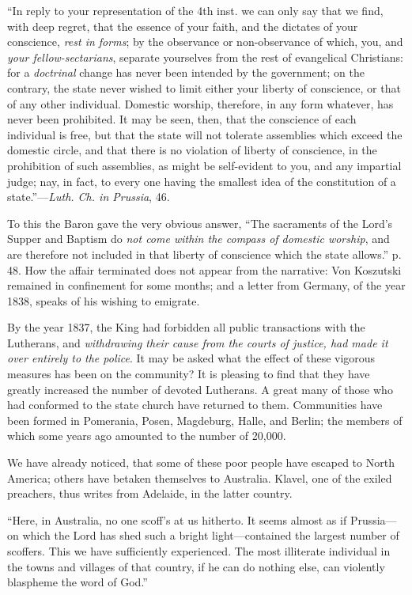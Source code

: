 ``In reply to your representation of
the 4th inst. we can only say that we find, with deep regret, that the
essence of your faith, and the dictates of your conscience, \emph{rest in
forms}; by the observance or non-observance of which, you, and \emph{your
fellow-sectarians}, separate yourselves from the rest of evangelical
Christians: for a \emph{doctrinal} change has never been intended by the
government; on the contrary, the state never wished to limit either your
liberty of conscience, or that of any other individual. Domestic
worship, therefore, in any form whatever, has never been prohibited. It
may be seen, then, that the conscience of each individual is free, but
that the state will not tolerate assemblies which exceed the domestic
circle, and that there is no violation of liberty of conscience, in the
prohibition of such assemblies, as might be self-evident to you, and any
impartial judge; nay, in fact, to every one having the smallest idea of
the constitution of a state.''—\emph{Luth. Ch. in Prussia}, 46.

To this the Baron gave the very obvious answer, ``The
sacraments of the Lord's Supper and Baptism do \emph{not come within the
compass of domestic worship}, and are therefore not included in that
liberty of conscience which the state allows.'' p. 48. How the affair
terminated does not appear from the narrative: Von Koszutski remained in
confinement for some months; and a letter from Germany, of the year
1838, speaks of his wishing to emigrate.

By the year 1837, the King had forbidden all public
transactions with the Lutherans, and \emph{withdrawing their cause from the
courts of justice, had made it over entirely to the police}. It may
be asked what the effect of these vigorous measures has been on the
community? It is pleasing to find that they have greatly increased the
number of devoted Lutherans. A great many of those who had conformed to
the state church have returned to them. Communities have been formed in
Pomerania, Posen, Magdeburg, Halle, and Berlin; the members of which
some years ago amounted to the number of 20,000.

We have already noticed, that some of these poor
people have escaped to North America; others have betaken themselves to
Australia. Klavel, one of the exiled preachers, thus writes from
Adelaide, in the latter country.

``Here, in Australia, no one scoff's
at us hitherto. It seems almost as if Prussia—on which the Lord has
shed such a bright light—contained the largest number of scoffers.
This we have sufficiently experienced. The most illiterate individual in
the towns and villages of that country, if he can do nothing else, can
violently blaspheme the word of God.''


